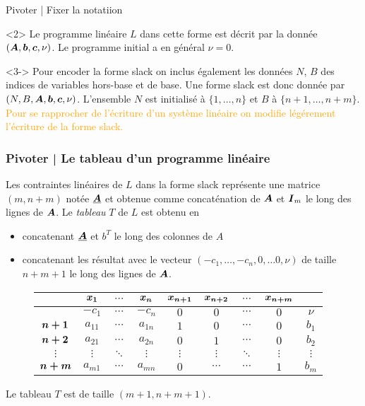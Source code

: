 \documentclass[aspectratio = 169]{beamer}
\begin{document}
\begin{frame}{Pivoter | Fixer la notatiion}
\begin{overlayarea}{\textwidth}{.3\textheight}
        \begin{onlyenv}<2> Le programme linéaire $L$ dans cette forme
          est décrit par la donnée $(\boldsymbol{A}, \boldsymbol{b}, \boldsymbol{c},
          \nu)$. Le programme initial a en général $\nu = 0$.
        \end{onlyenv}
        \begin{onlyenv}<3-> Pour encoder la forme slack on inclus
          également les données $N$, $B$ des indices de variables
          hors-base et de base. Une forme slack est donc donnée par
          $(N, B, \boldsymbol{A}, \boldsymbol{b}, \boldsymbol{c}, \nu)$. L'ensemble $N$ est
          initialisé à $\{1, \ldots, n\}$ et $B$ à
          $\{n+1, \ldots, n+m\}$. \pause[4] \textcolor{orange}{Pour se
            rapprocher de l'écriture d'un système linéaire on modifie
            légérement l'écriture de la forme slack.}
        \end{onlyenv}
    \end{overlayarea}
\end{frame}

\begin{frame}
  \frametitle{Pivoter | Le tableau d'un programme linéaire}
  Les contraintes linéaires de $L$ dans la forme slack représente une
  matrice $(m, n+m)$ notée $\underline{\boldsymbol{A}}$ et obtenue comme
  concaténation de $\boldsymbol{A}$ et $\boldsymbol{I}_m$ le long des lignes de
  $\boldsymbol{A}$. Le \emph{tableau} $T$ de $L$ est obtenu en
  \begin{itemize}
  \item<2-> concatenant $\underline{\boldsymbol{A}}$ et $b^T$ le long des
    colonnes de $A$
  \item<3-> concatenant les résultat avec le vecteur
    $(-c_1, \ldots, -c_n, 0, \ldots 0, \nu)$ de taille $n+m+1$ le long
    des lignes de $\boldsymbol{A}$.
  \end{itemize}
  \pause[4]
  \begin{figure}
    \begin{tabular}{c|ccc|cccc|c|}
       & \alert{$\boldsymbol{x_1}$} & \alert{$\cdots$} & \alert{$\boldsymbol{x_n}$} & \alert{$\boldsymbol{x_{n+1}}$} & \alert{$\boldsymbol{x_{n+2}}$} & \alert{$\cdots$} & \alert{$\boldsymbol{x_{n+m}}$} &  \\
      \hline
       & $-c_1$ & $\cdots$ & $-c_n$ & $0$ & $0$ & $\cdots$ & $0$ & $\nu$ \\
      \hline
      \alert{$\boldsymbol{n+1}$} & $a_{11}$ & $\cdots$ & $a_{1n}$ & $1$ & $0$ & $\cdots$ & $0$ & $b_1$ \\
      \alert{$\boldsymbol{n+2}$}& $a_{21}$ & $\cdots$ & $a_{2n}$ & $0$ & $1$ & $\cdots$ & $0$ & $b_2$ \\
      \alert{$\vdots$}& $\vdots$ & $\ddots$ & $\vdots$ & $\vdots$ & $\vdots$ & $\ddots$ & $\vdots$ & $\vdots$ \\
      \alert{$\boldsymbol{n+m}$} & $a_{m1}$ & $\cdots$  & $a_{mn}$  & $0$ & $\cdots$ & $\cdots$ & $1$ & $b_m$
    \end{tabular}
  \end{figure}
  Le tableau $T$ est de taille $(m + 1, n + m + 1)$.
\end{frame}
\end{document}
